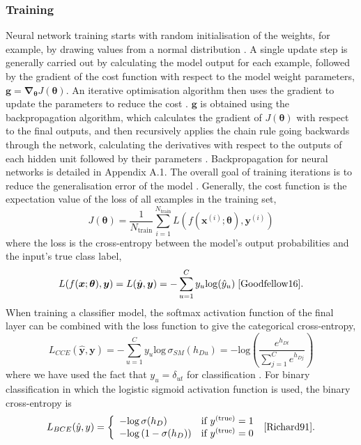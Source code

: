 \documentclass[12pt]{article}
\begin{document}
\subsubsection{Training}
Neural network training starts with random initialisation of the weights, for example, by drawing values from a normal distribution \cite{Goodfellow16}. A single update step is generally carried out by calculating the model output for each example, followed by the gradient of the cost function with respect to the model weight parameters, $\bm{g}=\bm\nabla_{\bm\theta}J(\bm\theta)$. An iterative optimisation algorithm then uses the gradient to update the parameters to reduce the cost \cite{Goodfellow16}. $\bm{g}$ is obtained using the backpropagation algorithm, which calculates the gradient of $J(\bm\theta)$ with respect to the final outputs, and then recursively applies the chain rule going backwards through the network, calculating the derivatives with respect to the outputs of each hidden unit followed by their parameters \cite{Haykin98}. Backpropagation for neural networks is detailed in Appendix A.1. The overall goal of training iterations is to reduce the generalisation error of the model \cite{Goodfellow16}. Generally, the cost function is the expectation value of the loss of all examples in the training set,
\begin{equation}
J(\bm\theta)=\frac{1}{N_{\mathrm{train}}}\sum_{i=1}^{N_{\mathrm{train}}}L(f(\bm{x}^{(i)};\bm\theta),\bm{y}^{(i)})
\end{equation}
where the loss is the cross-entropy between the model's output probabilities and the input's true class label,
\begin{equation}
L(f(\bm{x};\bm\theta),\bm{y})=L(\hat{\bm{y}},\bm{y})=-\sum_{u=1}^Cy_u\mathrm{log}(\hat{y}_u)\; \cite{Goodfellow16}.
\end{equation}
When training a classifier model, the softmax activation function of the final layer can be combined with the loss function to give the categorical cross-entropy,
\begin{equation}
L_{CCE}(\hat{\bm{y}},\bm{y})=-\sum_{u=1}^Cy_u\mathrm{log}\,\sigma_{SM}(h_{Du})=-\mathrm{log}\left(\frac{e^{h_{Dt}}}{\sum_{j=1}^{C}e^{h_{Dj}}}\right)
\end{equation}
where we have used the fact that $y_u=\delta_{ut}$ for classification \cite{Kline05}. For binary classification in which the logistic sigmoid activation function is used, the binary cross-entropy is
\begin{equation}
L_{BCE}(\hat{y},y)=
\left\{
\begin{array}{ll}
-\mathrm{log}\,\sigma(h_D) & \mbox{if } y^{(\mathrm{true})}=1 \\
-\mathrm{log}\left(1-\sigma(h_D)\right) & \mbox{if } y^{(\mathrm{true})}=0
\end{array}
\right.\;\cite{Richard91}.
\end{equation}
\end{document}
